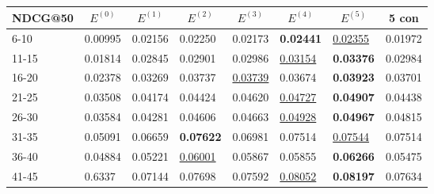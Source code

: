 \begin{table*}[]
    \begin{tabular}{|l|l|l|l|l|l|l||l|}
        \hline
        NDCG@50 & \multicolumn{1}{c|}{$E^{(0)}$} & \multicolumn{1}{c|}{$E^{(1)}$} & \multicolumn{1}{c|}{$E^{(2)}$} & \multicolumn{1}{c|}{$E^{(3)}$} & \multicolumn{1}{c|}{$E^{(4)}$} & \multicolumn{1}{c||}{$E^{(5)}$} & \multicolumn{1}{c|}{5 con} \\ \hline
        6-10    & 0.00995                        & 0.02156                        & 0.02250                        & 0.02173                        & \textbf{0.02441}               & \underline{0.02355}             & 0.01972                    \\ \hline
        11-15   & 0.01814                        & 0.02845                        & 0.02901                        & 0.02986                        & \underline{0.03154}            & \textbf{0.03376}                & 0.02984                    \\ \hline
        16-20   & 0.02378                        & 0.03269                        & 0.03737                        & \underline{0.03739}            & 0.03674                        & \textbf{0.03923}                & 0.03701                    \\ \hline
        21-25   & 0.03508                        & 0.04174                        & 0.04424                        & 0.04620                        & \underline{0.04727}            & \textbf{0.04907}                & 0.04438                    \\ \hline
        26-30   & 0.03584                        & 0.04281                        & 0.04606                        & 0.04663                        & \underline{0.04928}            & \textbf{0.04967}                & 0.04815                    \\ \hline
        31-35   & 0.05091                        & 0.06659                        & \textbf{0.07622}               & 0.06981                        & 0.07514                        & \underline{0.07544}             & 0.07514                    \\ \hline
        36-40   & 0.04884                        & 0.05221                        & \underline{0.06001}            & 0.05867                        & 0.05855                        & \textbf{0.06266}                & 0.05475                    \\ \hline
        41-45   & 0.6337                         & 0.07144                        & 0.07698                        & 0.07592                        & \underline{0.08052}            & \textbf{0.08197}                & 0.07634                    \\ \hline

\end{tabular}
\end{table*}
